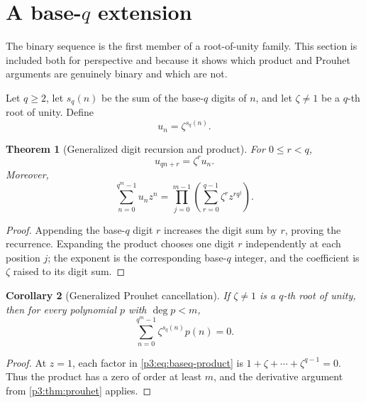 \documentclass[11pt,oneside]{article}
\newtheorem{theorem}{Theorem}[section]
\newtheorem{corollary}[theorem]{Corollary}
\theoremstyle{definition}
\theoremstyle{remark}
\newcommand{\1}{\mathbf 1}
\begin{document}
\section{A base-\texorpdfstring{\(q\)}{q} extension}
\label{p3:sec:baseq}

The binary sequence is the first member of a root-of-unity family.  This section is included
both for perspective and because it shows which product and Prouhet arguments are genuinely
binary and which are not.

Let \(q\ge2\), let \(s_q(n)\) be the sum of the base-\(q\) digits of \(n\), and let
\(\zeta\ne1\) be a \(q\)-th root of unity.  Define
\begin{equation}
 u_n=\zeta^{s_q(n)}.
 \label{p3:eq:generalized-TM}
\end{equation}

\begin{theorem}[Generalized digit recursion and product]
\label{p3:thm:baseq-product}
For \(0\le r<q\),
\begin{equation}
 u_{qn+r}=\zeta^r u_n.
 \label{p3:eq:baseq-recursion}
\end{equation}
Moreover,
\begin{equation}
 \boxed{
 \sum_{n=0}^{q^m-1}u_nz^n
 =\prod_{j=0}^{m-1}
   \left(\sum_{r=0}^{q-1}\zeta^r z^{rq^j}\right).}
 \label{p3:eq:baseq-product}
\end{equation}
\end{theorem}

\begin{proof}
Appending the base-\(q\) digit \(r\) increases the digit sum by \(r\), proving the recurrence.
Expanding the product chooses one digit \(r\) independently at each position \(j\); the
exponent is the corresponding base-\(q\) integer, and the coefficient is \(\zeta\) raised to
its digit sum.
\end{proof}

\begin{corollary}[Generalized Prouhet cancellation]
\label{p3:cor:baseq-prouhet}
If \(\zeta\ne1\) is a \(q\)-th root of unity, then for every polynomial \(p\) with
\(\deg p<m\),
\begin{equation}
 \sum_{n=0}^{q^m-1}\zeta^{s_q(n)}p(n)=0.
 \label{p3:eq:baseq-prouhet}
\end{equation}
\end{corollary}

\begin{proof}
At \(z=1\), each factor in \eqref{p3:eq:baseq-product} is
\(1+\zeta+\cdots+\zeta^{q-1}=0\).  Thus the product has a zero of order at least \(m\), and
the derivative argument from \cref{p3:thm:prouhet} applies.
\end{proof}
\end{document}
